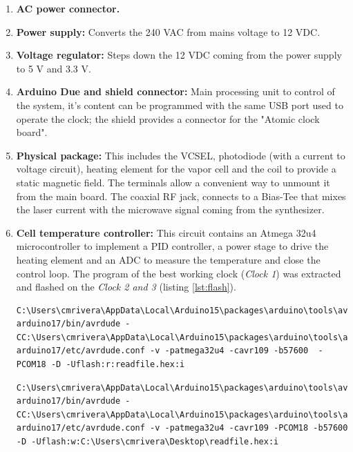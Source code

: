 \documentclass[a4paper,12pt]{article}
\begin{document}
\begin{enumerate}[wide, labelwidth=!, labelindent=0pt]
	\item \textbf{AC power connector.}
	\item \textbf{Power supply: } Converts the 240 VAC from mains voltage to 12 VDC.
	\item \textbf{Voltage regulator: } Steps down the 12 VDC coming from the power supply to 5 V and 3.3 V. 
	\item \textbf{Arduino Due and shield connector: } Main processing unit to control of the system, it's content can be programmed with the same USB port used to operate the clock; the shield provides a connector for the "Atomic clock board".
	\item \textbf{Physical package: } This includes the VCSEL, photodiode (with a current to voltage circuit), heating element for the vapor cell and the coil to provide a static magnetic field. The terminals allow a convenient way to unmount it from the main board. The coaxial RF jack, connects to a Bias-Tee that mixes the laser current with the microwave signal coming from the synthesizer.
    \item \textbf{Cell temperature controller: } This circuit contains an Atmega 32u4 microcontroller to implement a PID controller, a power stage to drive the heating element and an ADC to measure the temperature and close the control loop. The program of the best working clock (\textit{Clock 1}) was extracted and flashed on the \textit{Clock 2 and 3} (listing \ref{lst:flash}).
    
    \begin{lstlisting}[style=bash,label={lst:flash},caption={Read operation to extract microcontroller's binary (Windows CMD).}]
C:\Users\cmrivera\AppData\Local\Arduino15\packages\arduino\tools\avrdude\6.3.0-arduino17/bin/avrdude -CC:\Users\cmrivera\AppData\Local\Arduino15\packages\arduino\tools\avrdude\6.3.0-arduino17/etc/avrdude.conf -v -patmega32u4 -cavr109 -b57600  -PCOM18 -D -Uflash:r:readfile.hex:i
    \end{lstlisting}
    
    \begin{lstlisting}[style=bash,label={lst:flash},caption={Write operation to flash microcontroller's binary (Windows CMD).}]
C:\Users\cmrivera\AppData\Local\Arduino15\packages\arduino\tools\avrdude\6.3.0-arduino17/bin/avrdude -CC:\Users\cmrivera\AppData\Local\Arduino15\packages\arduino\tools\avrdude\6.3.0-arduino17/etc/avrdude.conf -v -patmega32u4 -cavr109 -PCOM18 -b57600 -D -Uflash:w:C:\Users\cmrivera\Desktop\readfile.hex:i 
    \end{lstlisting}
    

\end{enumerate}
\end{document}
